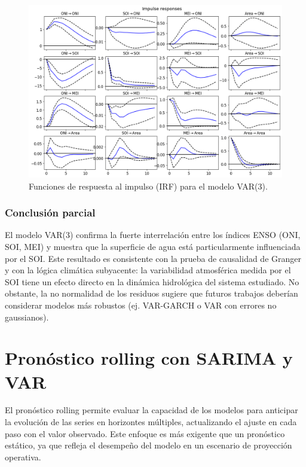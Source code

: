 \begin{figure}[H]
    \centering
    \includegraphics[scale=0.45]{Figures/var_ir.png}
    \caption{Funciones de respuesta al impulso (IRF) para el modelo VAR(3).}
    \label{fig:var_irf}
\end{figure}

\subsubsection{Conclusión parcial}
El modelo VAR(3) confirma la fuerte interrelación entre los índices ENSO (ONI, SOI, MEI) y muestra que la superficie de agua está particularmente influenciada por el SOI. Este resultado es consistente con la prueba de causalidad de Granger y con la lógica climática subyacente: la variabilidad atmosférica medida por el SOI tiene un efecto directo en la dinámica hidrológica del sistema estudiado. No obstante, la no normalidad de los residuos sugiere que futuros trabajos deberían considerar modelos más robustos (ej. VAR-GARCH o VAR con errores no gaussianos).



\section{Pronóstico rolling con SARIMA y VAR}

El pronóstico rolling permite evaluar la capacidad de los modelos para anticipar la evolución de las series en horizontes múltiples, actualizando el ajuste en cada paso con el valor observado. Este enfoque es más exigente que un pronóstico estático, ya que refleja el desempeño del modelo en un escenario de proyección operativa.

